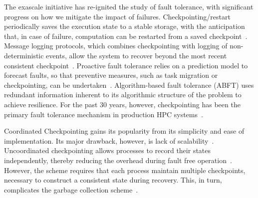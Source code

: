 
The exascale initiative has re-ignited the study of fault tolerance, with significant progress on how we mitigate the impact of failures. 
Checkpointing/restart periodically saves the execution state to a stable storage, with the anticipation that, in case of failure, 
computation can be restarted from a saved checkpoint~\cite{Chandy:1985:DSD:214451.214456}. 
Message logging protocols, which combines checkpointing with logging of non-deterministic events, allow the system to recover beyond the most recent consistent checkpoint~\cite{Strom85optimisticrecovery}. Proactive fault tolerance relies on a prediction model to forecast faults, so that preventive measures, such as task migration or checkpointing, can be undertaken~\cite{gainaru2012fault}. Algorithm-based fault tolerance (ABFT) uses redundant information inherent to its algorithmic structure of the problem to achieve resilience. %
For the past 30 years, however, checkpointing has been the primary fault tolerance mechanism in 
production HPC systems~\cite{ferreira_sc_2011}. 

Coordinated Checkpointing gains its popularity from its simplicity and ease of implementation. Its major drawback, however, is lack of scalability~\cite{hargrove2006berkeley}.
Uncoordinated checkpointing allows processes to record their states independently, thereby reducing the overhead during fault free operation~\cite{guermouche_2011_ipdps}. 
However, the scheme requires that
each process maintain multiple checkpoints, necessary to construct a consistent state during recovery. This, in turn, complicates the garbage collection scheme~\cite{Elnozahy:02:Survey}. %


